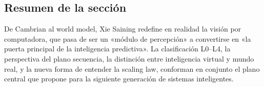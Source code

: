 \subsection{Resumen de la sección}

De Cambrian al world model, Xie Saining redefine en realidad la visión por computadora, que pasa de ser un «módulo de percepción» a convertirse en «la puerta principal de la inteligencia predictiva». La clasificación L0--L4, la perspectiva del plano secuencia, la distinción entre inteligencia virtual y mundo real, y la nueva forma de entender la scaling law, conforman en conjunto el plano central que propone para la siguiente generación de sistemas inteligentes.
